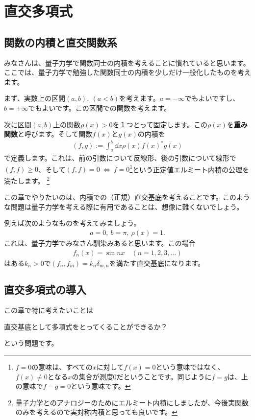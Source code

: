 \documentclass[report,paper=a4, fontsize=12pt, line_length=16cm, number_of_lines=33,dvipdfmx]{jlreq}
\newenvironment{myquote}{\begin{tcolorbox}[
  colback = blue!5, after = \noindent] }{\end{tcolorbox}}
\numberwithin{equation}{section}
\newcommand{\strong}[1]{\textsf{\bfseries #1}}
\begin{document}
\chapter{直交多項式}

\section{関数の内積と直交関数系}
みなさんは、量子力学で関数同士の内積を考えることに慣れていると思います。ここでは、量子力学で勉強した関数同士の内積を少しだけ一般化したものを考えます。

まず、実数上の区間$(a,b),\ (a<b)$を考えます。$a=-\infty$でもよいですし、$b=+\infty$でもよいです。この区間での関数を考えます。

次に区間$(a,b)$上の関数$\rho(x)> 0$を１つとって固定します。この$\rho(x)$を\strong{重み関数}と呼びます。そして関数$f(x)$と$g(x)$の内積を
\begin{align}
  (f,g):=\int_{a}^{b} \dd{x} \rho(x) f(x)^{*} g(x) \label{innerproduct}
\end{align}
で定義します。これは、前の引数について反線形、後の引数について線形で$(f,f)\ge 0$、そして$(f,f)=0\ \Leftrightarrow \ f=0$\footnote{$f=0$の意味は、すべての$x$に対して$f(x)=0$という意味ではなく、$f(x)\ne 0$となる$x$の集合が測度$0$だということです。同じように$f=g$は、上の意味で$f-g=0$という意味です。}という正定値エルミート内積の公理を満たします。 \footnote{量子力学とのアナロジーのためにエルミート内積にしましたが、今後実関数のみを考えるので実対称内積と思っても良いです。}

この章でやりたいのは、内積での（正規）直交基底を考えることです。このような問題は量子力学を考える際に有用であることは、想像に難くないでしょう。

例えば次のようなものを考えてみましょう。
\begin{align}
  a=0,\ b=\pi,\ \rho(x)=1.
\end{align}
これは、量子力学でみなさん馴染みあると思います。この場合
\begin{align}
  f_{n}(x)=\sin nx\quad (n=1,2,3,\dots)
\end{align}
はある$k_n>0$で$(f_n,f_m)=k_n\delta_{m,n}$を満たす直交基底になります。

\section{直交多項式の導入}
この章で特に考えたいことは
\begin{myquote}
  直交基底として多項式をとってくることができるか？
\end{myquote}
という問題です。
\end{document}
